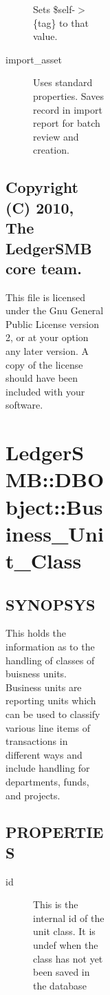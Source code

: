 \begin{description}
\begin{description}
\begin{description}
\begin{description}
\begin{description}
\begin{description}
\begin{description}
\begin{description}
\begin{description}
\begin{description}
Sets \$self-$>$\{tag\} to that value.


\item[{import\_asset}] \mbox{}

Uses standard properties.  Saves record in import report for batch review and 
creation.

\end{description}
\subsection*{Copyright (C) 2010, The LedgerSMB core team.\label{LedgerSMB::DBObject::Asset_Copyright_C_2010_The_LedgerSMB_core_team_}}


This file is licensed under the Gnu General Public License version 2, or at your
option any later version.  A copy of the license should have been included with
your software.

\section{LedgerSMB::DBObject::Business\_Unit\_Class\label{LedgerSMB::DBObject::Business_Unit_Class}}




\subsection*{SYNOPSYS\label{LedgerSMB::DBObject::Business_Unit_Class_SYNOPSYS}}


This holds the information as to the handling of classes of buisness units.  
Business units are reporting units which can be used to classify various line 
items of transactions in different ways and include handling for departments, 
funds, and projects.

\subsection*{PROPERTIES\label{LedgerSMB::DBObject::Business_Unit_Class_PROPERTIES}}
\begin{description}

\item[{id}] \mbox{}

This is the internal id of the unit class.  It is undef when the class has not
yet been saved in the database



\end{description}
\end{description}
\end{description}
\end{description}
\end{description}
\end{description}
\end{description}
\end{description}
\end{description}
\end{description}
